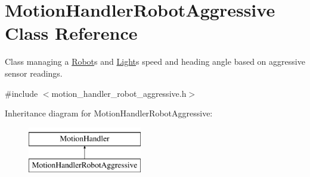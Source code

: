 \hypertarget{class_motion_handler_robot_aggressive}{}\section{Motion\+Handler\+Robot\+Aggressive Class Reference}
\label{class_motion_handler_robot_aggressive}


Class managing a \mbox{\hyperlink{class_robot}{Robot}}\textquotesingle{}s and \mbox{\hyperlink{class_light}{Light}}\textquotesingle{}s speed and heading angle based on aggressive sensor readings.  




{\ttfamily \#include $<$motion\+\_\+handler\+\_\+robot\+\_\+aggressive.\+h$>$}

Inheritance diagram for Motion\+Handler\+Robot\+Aggressive\+:\begin{figure}[H]
\begin{center}
\leavevmode
\includegraphics[height=2.000000cm]{class_motion_handler_robot_aggressive}
\end{center}
\end{figure}
